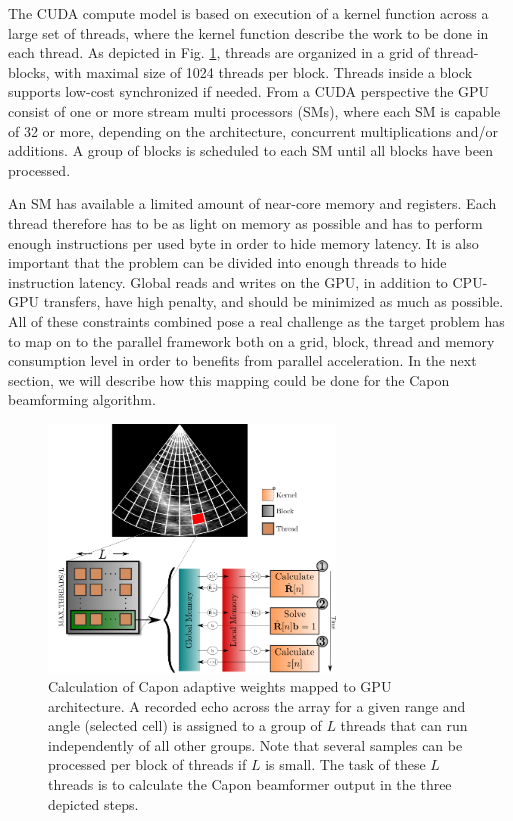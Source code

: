 \documentclass[12pt,journal,onecolumn]{IEEEtran}
\begin{document}
The CUDA compute model is based on execution of a kernel function across a large set of threads, where the kernel function describe the work to be done in each thread. As depicted in Fig. \ref{fig:gpulayout}, threads are organized in a grid of thread-blocks, with maximal size of 1024 threads per block. Threads inside a block supports low-cost synchronized if needed. From a CUDA perspective the GPU consist of one or more stream multi processors (SMs), where each SM is capable of 32 or more, depending on the architecture, concurrent multiplications and/or additions. A group of blocks is scheduled to each SM until all blocks have been processed. 

An SM has available a limited amount of near-core memory and registers. Each thread therefore has to be as light on memory as possible and has to perform enough instructions per used byte in order to hide memory latency. It is also important that the problem can be divided into enough threads to hide instruction latency. Global reads and writes on the GPU, in addition to CPU-GPU transfers, have high penalty, and should be minimized as much as possible. All of these constraints combined pose a real challenge as the target problem has to map on to the parallel framework both on a grid, block, thread and memory consumption level in order to benefits from parallel acceleration. In the next section, we will describe how this mapping could be done for the Capon beamforming algorithm.    

\begin{figure}
\centerline{\includegraphics[width=3in]{gfx/gpu_layout_vertical_lr.png}}
\caption{Calculation of Capon adaptive weights mapped to GPU architecture. A recorded echo across the array for a given range and angle (selected cell) is assigned to a group of $L$ threads that can run independently of all other groups. Note that several samples can be processed per block of threads if $L$ is small. The task of these $L$ threads is to calculate the Capon beamformer output in the three depicted steps.}
\label{fig:gpulayout}
\end{figure}
\end{document}
